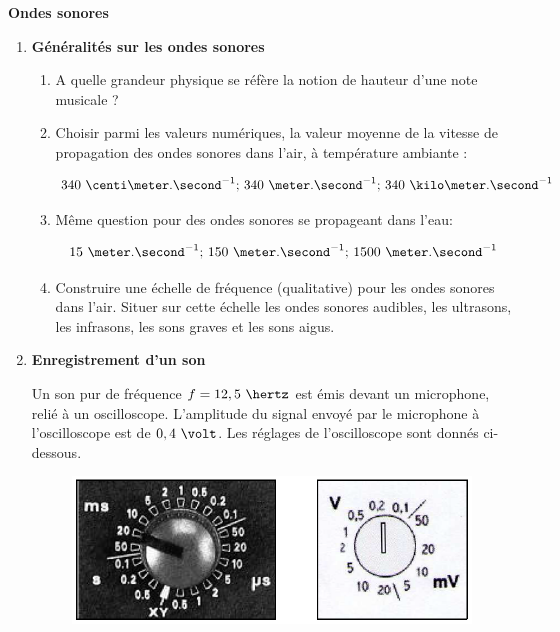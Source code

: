 \exo \textbf{Ondes sonores}

\vspace{0.3cm}

\begin{enumerate}

\item \textbf{Généralités sur les ondes sonores}

\begin{enumerate}[label=(\alph*)]
\item A quelle grandeur physique se réfère la notion de hauteur d'une note musicale ?
\item Choisir parmi les valeurs numériques, la valeur moyenne de la vitesse de propagation des ondes sonores dans l'air, à température ambiante :

$$340\text{ }\centi\meter.\second^{-1}\text{; }340\text{ }\meter.\second^{-1}\text{; }340\text{ }\kilo\meter.\second^{-1}$$

\item Même question pour des ondes sonores se propageant dans l'eau:

$$15\text{ }\meter.\second^{-1}\text{; }150\text{ }\meter.\second^{-1}\text{; }1500\text{ }\meter.\second^{-1}$$

\item Construire une échelle de fréquence (qualitative) pour les ondes sonores dans l'air. Situer sur
cette échelle les ondes sonores audibles, les ultrasons, les infrasons, les sons graves et les sons
aigus.

\end{enumerate}

\item \textbf{Enregistrement d'un son}

\vspace{0.3cm}

Un son pur de fréquence $f = 12,5\text{ }\hertz$ est émis devant un microphone, relié à un oscilloscope. L'amplitude du signal envoyé par le microphone à l'oscilloscope est de $0,4\text{ }\volt$. Les réglages de l'oscilloscope sont donnés ci-dessous.

\begin{figure}[h]
\begin{center}
\includegraphics[width=0.5\columnwidth]{images/Exo3_Ondes_Reglages_Oscillo}
\end{center}
\end{figure}


\end{enumerate}
